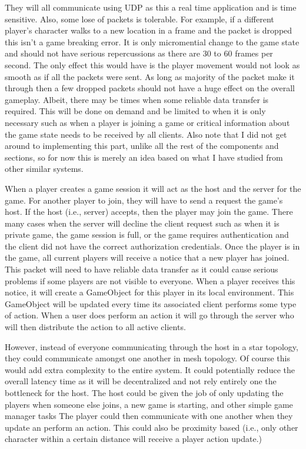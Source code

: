 \documentclass[conference]{IEEEtran}
\begin{document}
They will all communicate using UDP as this a real time application and is time sensitive.
Also, some lose of packets is tolerable.
For example, if a different player’s character walks to a new location in a frame and the packet is dropped this isn’t a game breaking error.
It is only micromential change to the game state and should not have serious repercussions as there are 30 to 60 frames per second.
The only effect this would have is the player movement would not look as smooth as if all the packets were sent.
As long as majority of the packet make it through then a few dropped packets should not have a huge effect on the overall gameplay.
Albeit, there may be times when some reliable data transfer is required.
This will be done on demand and be limited to when it is only necessary such as when a player is joining a game or critical information about the game state needs to be received by all clients.
Also note that I did not get around to implementing this part, unlike all the rest of the components and sections, so for now this is merely an idea based on what I have studied from other similar systems.

When a player creates a game session it will act as the host and the server for the game.
For another player to join, they will have to send a request the game’s host.
If the host (i.e., server) accepts, then the player may join the game.
There many cases when the server will decline the client request such as when it is private game, the game session is full, or the game requires authentication and the client did not have the correct authorization credentials.
Once the player is in the game, all current players will receive a notice that a new player has joined.
This packet will need to have reliable data transfer as it could cause serious problems if some players are not visible to everyone.
When a player receives this notice, it will create a GameObject for this player in its local environment.
This GameObject will be updated every time its associated client performs some type of action.
When a user does perform an action it will go through the server who will then distribute the action to all active clients.


However, instead of everyone communicating through the host in a star topology, they could communicate amongst one another in mesh topology.
Of course this would add extra complexity to the entire system.
It could potentially reduce the overall latency time as it will be decentralized and not rely entirely one the bottleneck for the host.
The host could be given the job of only updating the players when someone else joins, a new game is starting, and other simple game manager tasks
The player could then communicate with one another when they update an perform an action.
This could also be proximity based (i.e., only other character within a certain distance will receive a player action update.)
\end{document}

